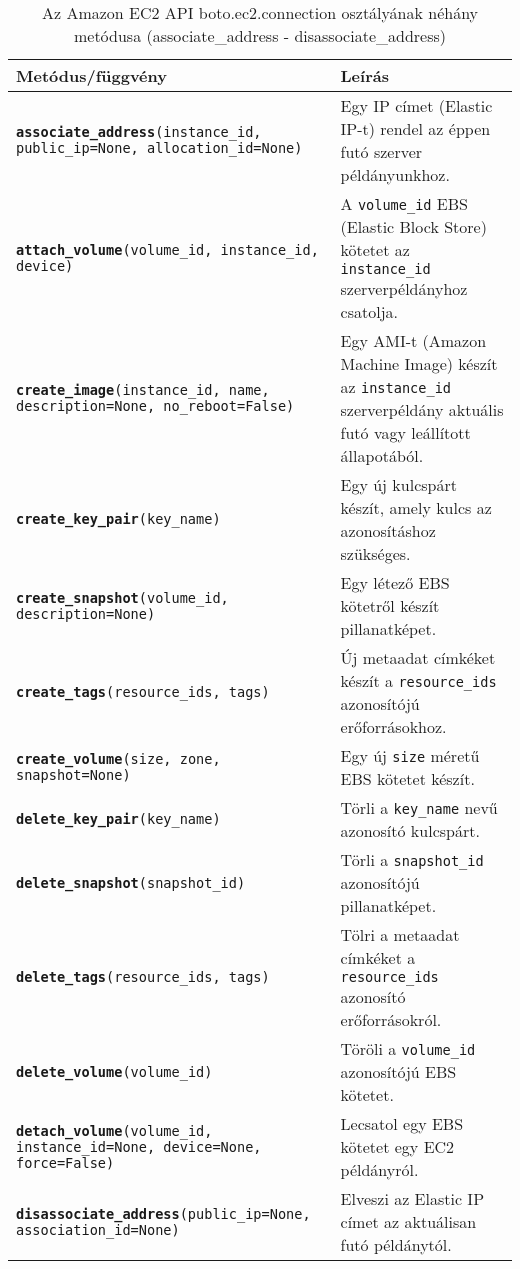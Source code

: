 \begin{table}[h]
	\caption{Az Amazon EC2 API boto.ec2.connection osztályának néhány metódusa (associate\_address - disassociate\_address)}
	\centering
	\small
	\begin{tabular}{| p{7.5cm} | p{6.5cm} |}
		\hline
		\rowcolor{MyTableColor} \textbf{Metódus/függvény} & \textbf{Leírás} \\
		\hline
		\texttt{\textbf{associate\_address}(instance\_id, public\_ip=None, allocation\_id=None)} & Egy IP címet (Elastic IP-t) rendel az éppen futó szerver példányunkhoz. \\
		\hline
		\texttt{\textbf{attach\_volume}(volume\_id, instance\_id, device)} & A \texttt{volume\_id} EBS (Elastic Block Store) kötetet az \texttt{instance\_id} szerverpéldányhoz csatolja. \\
		\hline
		\texttt{\textbf{create\_image}(instance\_id, name, description=None, no\_reboot=False)} & Egy AMI-t (Amazon Machine Image) készít az \texttt{instance\_id} szerverpéldány aktuális futó vagy leállított állapotából. \\
		\hline
    	\texttt{\textbf{create\_key\_pair}(key\_name)} & Egy új kulcspárt készít, amely kulcs az azonosításhoz szükséges. \\
		\hline
		\texttt{\textbf{create\_snapshot}(volume\_id, description=None)} & Egy létező EBS kötetről készít pillanatképet. \\
		\hline
		\texttt{\textbf{create\_tags}(resource\_ids, tags)} & Új metaadat címkéket készít a \texttt{resource\_ids} azonosítójú erőforrásokhoz. \\
		\hline
        \texttt{\textbf{create\_volume}(size, zone, snapshot=None)} & Egy új \texttt{size} méretű EBS kötetet készít. \\
        \hline
        \texttt{\textbf{delete\_key\_pair}(key\_name)} & Törli a \texttt{key\_name} nevű azonosító kulcspárt. \\
        \hline
        \texttt{\textbf{delete\_snapshot}(snapshot\_id)} & Törli a \texttt{snapshot\_id} azonosítójú pillanatképet. \\
        \hline        
        \texttt{\textbf{delete\_tags}(resource\_ids, tags)} & Tölri a metaadat címkéket a \texttt{resource\_ids} azonosító erőforrásokról. \\
        \hline
        \texttt{\textbf{delete\_volume}(volume\_id)} & Töröli a \texttt{volume\_id} azonosítójú EBS kötetet. \\
        \hline
        \texttt{\textbf{detach\_volume}(volume\_id, instance\_id=None, device=None, force=False)} & Lecsatol egy EBS kötetet egy EC2 példányról. \\
        \hline
        \texttt{\textbf{disassociate\_address}(public\_ip=None, association\_id=None)} & Elveszi az Elastic IP címet az aktuálisan futó példánytól. \\        
        \hline
    \end{tabular}
	\normalsize
	\label{tab:aws_boto_ec2_01}
\end{table}        
        
